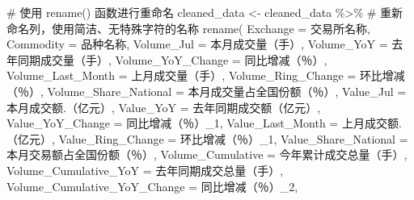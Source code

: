 \documentclass[
  letterpaper,
  DIV=11,
  numbers=noendperiod]{scrartcl}
\newenvironment{Shaded}{\begin{snugshade}}{\end{snugshade}}
\newcommand{\AttributeTok}[1]{\textcolor[rgb]{0.40,0.45,0.13}{#1}}
\newcommand{\CommentTok}[1]{\textcolor[rgb]{0.37,0.37,0.37}{#1}}
\newcommand{\FunctionTok}[1]{\textcolor[rgb]{0.28,0.35,0.67}{#1}}
\newcommand{\NormalTok}[1]{\textcolor[rgb]{0.00,0.23,0.31}{#1}}
\newcommand{\OtherTok}[1]{\textcolor[rgb]{0.00,0.23,0.31}{#1}}
\newcommand{\SpecialCharTok}[1]{\textcolor[rgb]{0.37,0.37,0.37}{#1}}
\newcommand{\StringTok}[1]{\textcolor[rgb]{0.13,0.47,0.30}{#1}}
\begin{document}
\begin{Shaded}
\begin{Highlighting}[]
\CommentTok{\# 使用 rename() 函数进行重命名}
\NormalTok{cleaned\_data }\OtherTok{\textless{}{-}}\NormalTok{ cleaned\_data }\SpecialCharTok{\%\textgreater{}\%}
  \CommentTok{\# 重新命名列，使用简洁、无特殊字符的名称}
  \FunctionTok{rename}\NormalTok{(}
    \AttributeTok{Exchange =} \StringTok{\textasciigrave{}}\AttributeTok{交易所名称}\StringTok{\textasciigrave{}}\NormalTok{,}
    \AttributeTok{Commodity =} \StringTok{\textasciigrave{}}\AttributeTok{品种名称}\StringTok{\textasciigrave{}}\NormalTok{,}
    \AttributeTok{Volume\_Jul =} \StringTok{\textasciigrave{}}\AttributeTok{本月成交量（手）}\StringTok{\textasciigrave{}}\NormalTok{,}
    \AttributeTok{Volume\_YoY =} \StringTok{\textasciigrave{}}\AttributeTok{去年同期成交量（手）}\StringTok{\textasciigrave{}}\NormalTok{,}
    \AttributeTok{Volume\_YoY\_Change =} \StringTok{\textasciigrave{}}\AttributeTok{同比增减（％）}\StringTok{\textasciigrave{}}\NormalTok{,}
    \AttributeTok{Volume\_Last\_Month =} \StringTok{\textasciigrave{}}\AttributeTok{上月成交量（手）}\StringTok{\textasciigrave{}}\NormalTok{,}
    \AttributeTok{Volume\_Ring\_Change =} \StringTok{\textasciigrave{}}\AttributeTok{环比增减（％）}\StringTok{\textasciigrave{}}\NormalTok{,}
    \AttributeTok{Volume\_Share\_National =} \StringTok{\textasciigrave{}}\AttributeTok{本月成交量占全国份额（％）}\StringTok{\textasciigrave{}}\NormalTok{,}
    \AttributeTok{Value\_Jul =} \StringTok{\textasciigrave{}}\AttributeTok{本月成交额.（亿元）}\StringTok{\textasciigrave{}}\NormalTok{, }
    \AttributeTok{Value\_YoY =} \StringTok{\textasciigrave{}}\AttributeTok{去年同期成交额（亿元）}\StringTok{\textasciigrave{}}\NormalTok{,}
    \AttributeTok{Value\_YoY\_Change =} \StringTok{\textasciigrave{}}\AttributeTok{同比增减（％）\_1}\StringTok{\textasciigrave{}}\NormalTok{,}
    \AttributeTok{Value\_Last\_Month =} \StringTok{\textasciigrave{}}\AttributeTok{上月成交额.（亿元）}\StringTok{\textasciigrave{}}\NormalTok{, }
    \AttributeTok{Value\_Ring\_Change =} \StringTok{\textasciigrave{}}\AttributeTok{环比增减（％）\_1}\StringTok{\textasciigrave{}}\NormalTok{,}
    \AttributeTok{Value\_Share\_National =} \StringTok{\textasciigrave{}}\AttributeTok{本月交易额占全国份额（％）}\StringTok{\textasciigrave{}}\NormalTok{,}
    \AttributeTok{Volume\_Cumulative =} \StringTok{\textasciigrave{}}\AttributeTok{今年累计成交总量（手）}\StringTok{\textasciigrave{}}\NormalTok{,}
    \AttributeTok{Volume\_Cumulative\_YoY =} \StringTok{\textasciigrave{}}\AttributeTok{去年同期成交总量（手）}\StringTok{\textasciigrave{}}\NormalTok{,}
    \AttributeTok{Volume\_Cumulative\_YoY\_Change =} \StringTok{\textasciigrave{}}\AttributeTok{同比增减（％）\_2}\StringTok{\textasciigrave{}}\NormalTok{,}

\end{Highlighting}
\end{Shaded}
\end{document}

